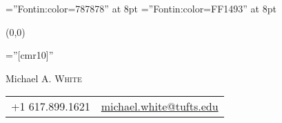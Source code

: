 \documentclass[letterpaper,10pt]{article}
\begin{document}
\font\wm=''Fontin:color=787878'' at 8pt	%
\font\wmweb=''Fontin:color=FF1493'' at 8pt
{\wm 
	\begin{textblock}{1}(0,0)
	\end{textblock}
}

\pagestyle{empty} %

\font\fb=''[cmr10]'' %

\par{\centering
		{\Huge Michael A. \textsc{White}
	}\bigskip\par}


\def \leftcol {p{5em}}
\def \rightcol {p{12cm}}
\newcommand{\opentable}{ \begin{tabular}{\leftcol\rightcol} }
\newcommand{\closetable}{ \end{tabular}	\vspace{-5em} }

\newcommand{\job}[5]{
	\textsc{#1}		& #3 at \textsc{#4} \\
	\textsc{#2}		& \small{#5}		\\
	\multicolumn{2}{c}{} 				\\
}

\newcommand{\edu}[5]{
	\textsc{#1}		& 
	\ifthenelse{\equal{#2}{}}{}{#2, } 
	\textsc{#3} 
	\ifthenelse{\equal{#4}{}}{}{, #4}
	\ifthenelse{\equal{#5}{}}{}{\par #5}\\	
}

\newcommand{\skillset}[2]{
	#1: & #2 \\
}


\begin{center}
\begin{tabular}{lr}
    +1 617.899.1621           &
     \href{mailto:michael.white@tufts.edu}{michael.white@tufts.edu}     %
\end{tabular}
\end{center}
\end{document}
